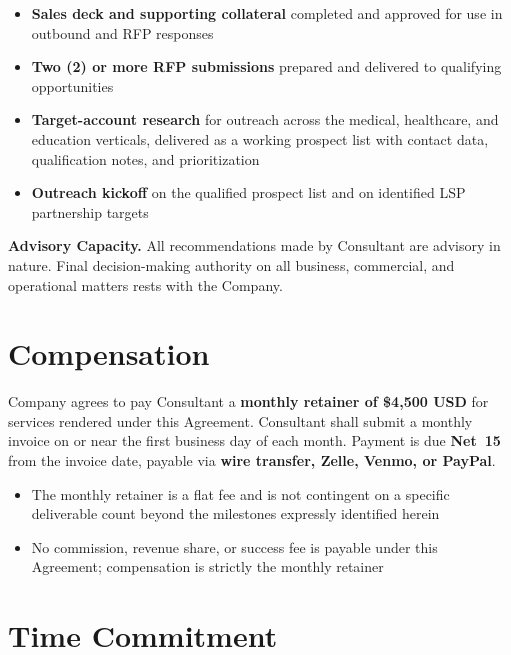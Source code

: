 \documentclass{toospoint}
\begin{document}
\begin{itemize}[leftmargin=1.5em, itemsep=4pt, topsep=4pt]
  \item \textbf{Sales deck and supporting collateral} completed and approved for use in outbound and RFP responses
  \item \textbf{Two (2) or more RFP submissions} prepared and delivered to qualifying opportunities
  \item \textbf{Target-account research} for outreach across the medical, healthcare, and education verticals, delivered as a working prospect list with contact data, qualification notes, and prioritization
  \item \textbf{Outreach kickoff} on the qualified prospect list and on identified LSP partnership targets
\end{itemize}

\begin{clausebox}
\sffamily\footnotesize\color{TPGray}
\textbf{Advisory Capacity.} All recommendations made by Consultant are advisory
in nature. Final decision-making authority on all business, commercial, and
operational matters rests with the Company.
\end{clausebox}

\section{Compensation}

Company agrees to pay Consultant a \textbf{monthly retainer of \$4{,}500 USD}
for services rendered under this Agreement. Consultant shall submit a monthly
invoice on or near the first business day of each month. Payment is due
\textbf{Net~15} from the invoice date, payable via \textbf{wire transfer,
Zelle, Venmo, or PayPal}.

\begin{itemize}[leftmargin=1.5em, itemsep=4pt, topsep=4pt]
  \item The monthly retainer is a flat fee and is not contingent on a specific deliverable count beyond the milestones expressly identified herein
  \item No commission, revenue share, or success fee is payable under this Agreement; compensation is strictly the monthly retainer
\end{itemize}

\section{Time Commitment}
\end{document}

